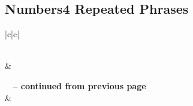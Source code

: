 \subsection{Numbers4 Repeated Phrases}


\normalsize
 
\begin{center}
\begin{longtable}{|c|c|}
\caption[Numbers4 Repeated Phrases]{Numbers4 Repeated Phrases}\label{table:Repeated Phrases Numbers4} \\
\hline {} &  \\ \hline 
\endfirsthead
 
{{\bfseries \tablename\ \thetable{} -- continued from previous page}} \\  
\hline {} &  \\ \hline 
\endhead
 

\end{longtable}
\end{center}
